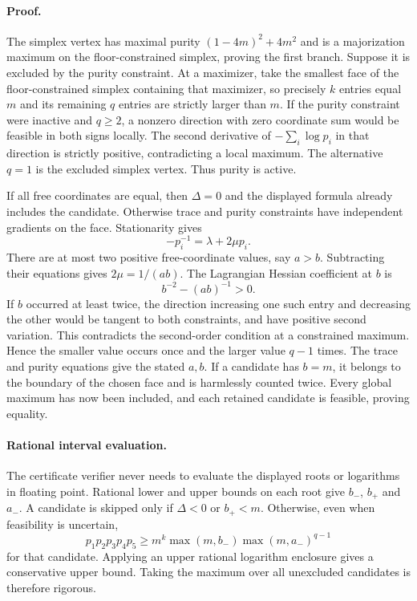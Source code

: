 \documentclass[11pt,a4paper]{article}
\begin{document}
\paragraph{Proof.}
The simplex vertex has maximal purity $(1-4m)^2+4m^2$ and is a
majorization maximum on the floor-constrained simplex, proving the first
branch. Suppose it is excluded by the purity constraint.
At a maximizer, take the smallest face of the floor-constrained simplex
containing that maximizer, so precisely $k$ entries equal $m$ and its
remaining $q$ entries are strictly larger than $m$.
If the purity constraint were inactive and $q\ge2$, a nonzero direction
with zero coordinate sum would be feasible in both signs locally.
The second derivative of $-\sum_i\log p_i$ in that direction is strictly
positive, contradicting a local maximum. The alternative $q=1$ is the
excluded simplex vertex. Thus purity is active.

If all free coordinates are equal, then $\Delta=0$ and the displayed
formula already includes the candidate. Otherwise trace and purity
constraints have independent gradients on the face. Stationarity gives
\[
 -p_i^{-1}=\lambda+2\mu p_i.
\]
There are at most two positive free-coordinate values, say $a>b$.
Subtracting their equations gives $2\mu=1/(ab)$. The Lagrangian Hessian
coefficient at $b$ is
\[
 b^{-2}-(ab)^{-1}>0.
\]
If $b$ occurred at least twice, the direction increasing one such entry
and decreasing the other would be tangent to both constraints, and have
positive second variation. This contradicts the second-order condition
at a constrained maximum. Hence the smaller value occurs once and the
larger value $q-1$ times. The trace and purity equations give the stated
$a,b$. If a candidate has $b=m$, it belongs to the boundary of the chosen
face and is harmlessly counted twice. Every global maximum has now been
included, and each retained candidate is feasible, proving equality.

\paragraph{Rational interval evaluation.}
The certificate verifier never needs to evaluate the displayed roots or
logarithms in floating point. Rational lower and upper bounds on each
root give $b_-$, $b_+$ and $a_-$. A candidate is skipped only if
$\Delta<0$ or $b_+<m$. Otherwise, even when feasibility is uncertain,
\[
 p_1p_2p_3p_4p_5\ge m^k\max(m,b_-)\max(m,a_-)^{q-1}
\]
for that candidate. Applying an upper rational logarithm enclosure gives
a conservative upper bound. Taking the maximum over all unexcluded
candidates is therefore rigorous.
\end{document}
